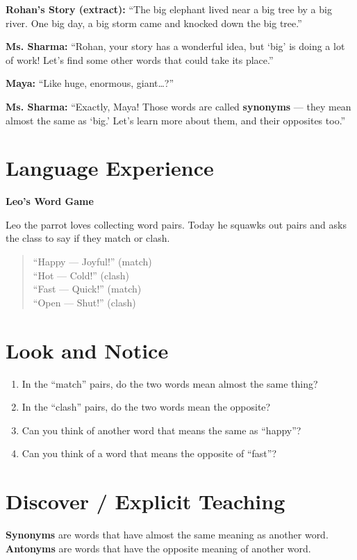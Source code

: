 \textbf{Rohan's Story (extract):} ``The big elephant lived near a big tree by a big river. One big day, a big storm came and knocked down the big tree.''

\textbf{Ms. Sharma:} ``Rohan, your story has a wonderful idea, but `big' is doing a lot of work! Let's find some other words that could take its place.''

\textbf{Maya:} ``Like huge, enormous, giant\ldots?''

\textbf{Ms. Sharma:} ``Exactly, Maya! Those words are called \textbf{synonyms} --- they mean almost the same as `big.' Let's learn more about them, and their opposites too.''

\section{Language Experience}
\textbf{Leo's Word Game}

Leo the parrot loves collecting word pairs. Today he squawks out pairs and asks the class to say if they match or clash.

\begin{quote}
``Happy --- Joyful!'' (match) \\
``Hot --- Cold!'' (clash) \\
``Fast --- Quick!'' (match) \\
``Open --- Shut!'' (clash)
\end{quote}

\section{Look and Notice}
\begin{thinkbox}
\begin{enumerate}
    \item In the ``match'' pairs, do the two words mean almost the same thing?
    \item In the ``clash'' pairs, do the two words mean the opposite?
    \item Can you think of another word that means the same as ``happy''?
    \item Can you think of a word that means the opposite of ``fast''?
\end{enumerate}
\end{thinkbox}

\section{Discover / Explicit Teaching}
\textbf{Synonyms} are words that have almost the same meaning as another word.
\textbf{Antonyms} are words that have the opposite meaning of another word.

